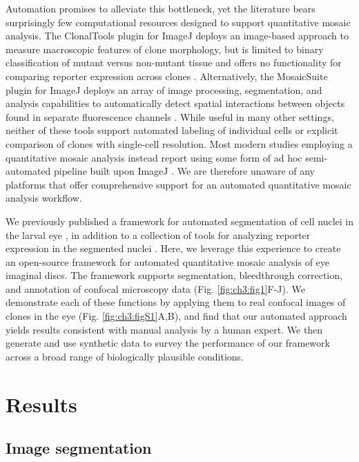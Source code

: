 Automation promises to alleviate this bottleneck, yet the literature bears surprisingly few computational resources designed to support quantitative mosaic analysis. The ClonalTools plugin for ImageJ deploys an image-based approach to measure macroscopic features of clone morphology, but is limited to binary classification of mutant versus non-mutant tissue and offers no functionality for comparing reporter expression across clones \cite{Mort2009}. Alternatively, the MosaicSuite plugin for ImageJ deploys an array of image processing, segmentation, and analysis capabilities to automatically detect spatial interactions between objects found in separate fluorescence channels \cite{Helmuth2010,Shivanandan2013}. While useful in many other settings, neither of these tools support automated labeling of individual cells or explicit comparison of clones with single-cell resolution. Most modern studies employing a quantitative mosaic analysis instead report using some form of ad hoc semi-automated pipeline built upon ImageJ \cite{Burrous2017,Ghiglione2018,Li2018}. We are therefore unaware of any platforms that offer comprehensive support for an automated quantitative mosaic analysis workflow.

We previously published a framework for automated segmentation of cell nuclei in the larval eye \cite{Pelaez2015}, in addition to a collection of tools for analyzing reporter expression in the segmented nuclei \cite{Bernasek2018}. Here, we leverage this experience to create an open-source framework for automated quantitative mosaic analysis of eye imaginal discs. The framework supports segmentation, bleedthrough correction, and annotation of confocal microscopy data (Fig. \ref{fig:ch3:fig1}F-J). We demonstrate each of these functions by applying them to real confocal images of clones in the eye (Fig. \ref{fig:ch3:figS1}A,B), and find that our automated approach yields results consistent with manual analysis by a human expert. We then generate and use synthetic data to survey the performance of our framework across a broad range of biologically plausible conditions.

\section{Results}

\subsection{Image segmentation}

